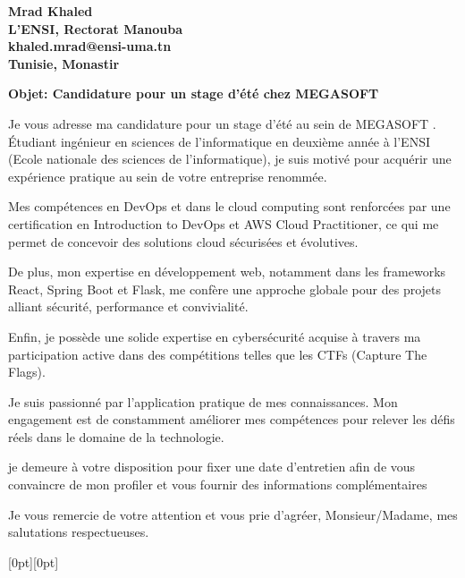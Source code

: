 \documentclass[a4paper, 12pt]{letter}
\date{}
\begin{document}
\begin{letter}
{
\selectfont
\bfseries
    Mrad Khaled\\
    L'ENSI, Rectorat Manouba\\
    khaled.mrad@ensi-uma.tn	\\ Tunisie, Monastir 	 \newline \newline
    
 
    
}

\opening { {
\selectfont
\bfseries Objet: Candidature pour un stage d'été chez MEGASOFT } \newline}

\selectfont

Je vous adresse ma candidature pour un stage d'été au sein de MEGASOFT . Étudiant ingénieur en sciences de l'informatique en deuxième année à l'ENSI (Ecole nationale des sciences de l'informatique), je suis motivé pour acquérir une expérience pratique au sein de votre entreprise renommée.

Mes compétences en DevOps et dans le cloud computing sont renforcées par une certification en Introduction to DevOps et AWS Cloud Practitioner, ce qui me permet de concevoir des solutions cloud sécurisées et évolutives.

De plus, mon expertise en développement web, notamment dans les frameworks React, Spring Boot et Flask, me confère une approche globale pour des projets alliant sécurité, performance et convivialité.

Enfin, je possède une solide expertise en cybersécurité acquise à travers ma participation active dans des compétitions telles que les CTFs (Capture The Flags).

Je suis passionné par l'application pratique de mes connaissances. Mon engagement est de constamment améliorer mes compétences pour relever les défis réels dans le domaine de la technologie.

je demeure à votre disposition pour fixer une date d'entretien afin de vous convaincre de mon profiler et vous fournir des informations complémentaires

Je vous remercie de votre attention et vous prie d'agréer, Monsieur/Madame, mes salutations respectueuses.


\hspace{9cm}%
\raisebox{18.1cm}[0pt][0pt]{
\setlength{\fboxrule}{0pt}
  }
\end{letter}
\end{document}
